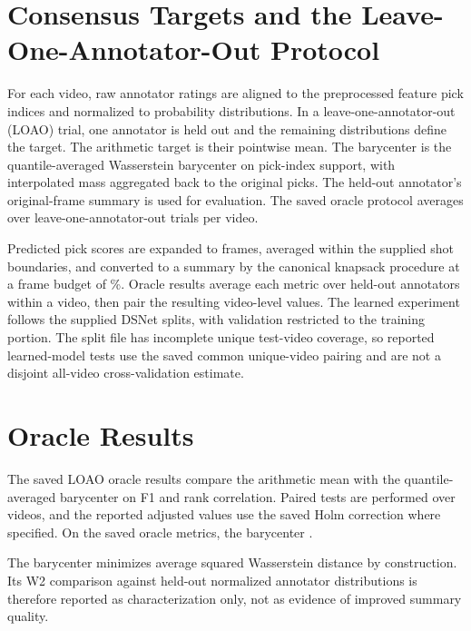 \documentclass[11pt,a4paper]{article}
\begin{document}
\section{Consensus Targets and the Leave-One-Annotator-Out Protocol}
For each video, raw annotator ratings are aligned to the preprocessed feature
pick indices and normalized to probability distributions. In a
leave-one-annotator-out (LOAO) trial, one annotator is held out and the
remaining distributions define the target. The arithmetic target is their
pointwise mean. The barycenter is the \BarycenterDimension{} quantile-averaged
Wasserstein barycenter on pick-index support, with interpolated mass
aggregated back to the original picks. The held-out annotator's original-frame
summary is used for evaluation. The saved oracle protocol averages over
\OracleAnnotators{} leave-one-annotator-out trials per video.

Predicted pick scores are expanded to frames, averaged within the supplied
shot boundaries, and converted to a summary by the canonical knapsack
procedure at a frame budget of \BudgetPercent\%. Oracle results average each metric over held-out
annotators within a video, then pair the resulting video-level values. The
learned experiment follows the supplied DSNet splits, with validation
restricted to the training portion. The split file has incomplete unique
test-video coverage, so reported learned-model tests use the saved common
unique-video pairing and are not a disjoint all-video cross-validation
estimate.

\section{Oracle Results}
The saved LOAO oracle results compare the arithmetic mean with the
quantile-averaged barycenter on F1 and rank correlation. Paired tests are
performed over videos, and the reported adjusted values use the saved Holm
correction where specified. On the saved oracle metrics, the barycenter
\OracleDirection{}.



The barycenter minimizes average \BarycenterDimension{} squared Wasserstein distance
by construction. Its W2 comparison against held-out normalized annotator
distributions is therefore reported as characterization only, not as
evidence of improved summary quality.

\end{document}
